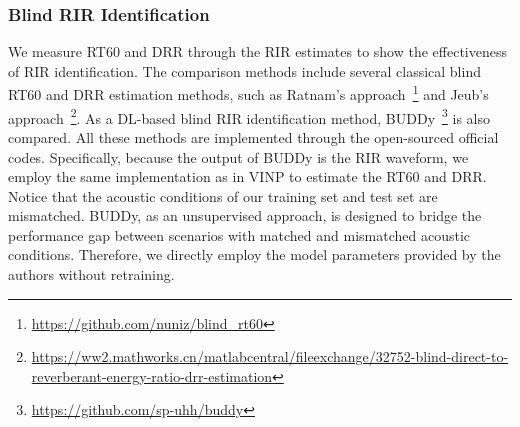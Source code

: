 \subsubsection{{Blind RIR Identification}}
We measure RT60 and DRR through the RIR estimates to show the effectiveness of RIR identification.
The comparison methods include several classical blind RT60 and DRR estimation methods, such as Ratnam's approach~\cite{ratnam2003blind}\footnote{\url{https://github.com/nuniz/blind_rt60}} and Jeub's approach~\cite{jeub2011blind}\footnote{\url{https://ww2.mathworks.cn/matlabcentral/fileexchange/32752-blind-direct-to-reverberant-energy-ratio-drr-estimation}}.
As a DL-based blind RIR identification method, BUDDy~\cite{lemercier2024unsupervised}\footnote{\url{https://github.com/sp-uhh/buddy}} is also compared.
All these methods are implemented through the open-sourced official codes. 
Specifically, because the output of BUDDy is the RIR waveform, we employ the same implementation as in VINP to estimate the RT60 and DRR.
Notice that the acoustic conditions of our training set and test set are mismatched. 
BUDDy, as an unsupervised approach, is designed to bridge the performance gap between scenarios with matched and mismatched acoustic conditions. 
Therefore, we directly employ the model parameters provided by the authors without retraining.


